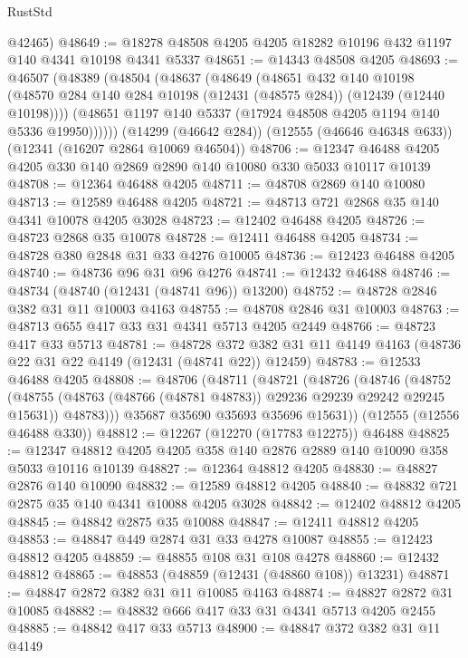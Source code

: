 \begin{lexlean}{RustStd}
\begin{coremodule}
      @42465)
@48649 := @18278 @48508 @4205 @4205 @18282 @10196 @432 @1197 @140 @4341 @10198 @4341 @5337
@48651 := @14343 @48508 @4205
@48693 := @46507
    (@48389
      (@48504
        (@48637
          (@48649
            (@48651
              @432
              @140
              @10198
              (@48570 @284 @140 @284 @10198 (@12431 (@48575 @284)) (@12439 (@12440 @10198))))
            (@48651 @1197 @140 @5337 (@17924 @48508 @4205 @1194 @140 @5336 @19950))))))
    (@14299 (@46642 @284))
    (@12555 (@46646 @46348 @633))
    (@12341 (@16207 @2864 @10069 @46504))
@48706 := @12347 @46488 @4205 @4205 @330 @140 @2869 @2890 @140 @10080 @330 @5033 @10117 @10139
@48708 := @12364 @46488 @4205
@48711 := @48708 @2869 @140 @10080
@48713 := @12589 @46488 @4205
@48721 := @48713 @721 @2868 @35 @140 @4341 @10078 @4205 @3028
@48723 := @12402 @46488 @4205
@48726 := @48723 @2868 @35 @10078
@48728 := @12411 @46488 @4205
@48734 := @48728 @380 @2848 @31 @33 @4276 @10005
@48736 := @12423 @46488 @4205
@48740 := @48736 @96 @31 @96 @4276
@48741 := @12432 @46488
@48746 := @48734 (@48740 (@12431 (@48741 @96)) @13200)
@48752 := @48728 @2846 @382 @31 @11 @10003 @4163
@48755 := @48708 @2846 @31 @10003
@48763 := @48713 @655 @417 @33 @31 @4341 @5713 @4205 @2449
@48766 := @48723 @417 @33 @5713
@48781 := @48728
    @372
    @382
    @31
    @11
    @4149
    @4163
    (@48736 @22 @31 @22 @4149 (@12431 (@48741 @22)) @12459)
@48783 := @12533 @46488 @4205
@48808 := @48706
    (@48711
      (@48721
        (@48726
          (@48746
            (@48752
              (@48755 (@48763 (@48766 (@48781 @48783)) @29236 @29239 @29242 @29245 @15631))
              @48783)))
        @35687
        @35690
        @35693
        @35696
        @15631))
    (@12555 (@12556 @46488 @330))
@48812 := @12267 (@12270 (@17783 @12275)) @46488
@48825 := @12347 @48812 @4205 @4205 @358 @140 @2876 @2889 @140 @10090 @358 @5033 @10116 @10139
@48827 := @12364 @48812 @4205
@48830 := @48827 @2876 @140 @10090
@48832 := @12589 @48812 @4205
@48840 := @48832 @721 @2875 @35 @140 @4341 @10088 @4205 @3028
@48842 := @12402 @48812 @4205
@48845 := @48842 @2875 @35 @10088
@48847 := @12411 @48812 @4205
@48853 := @48847 @449 @2874 @31 @33 @4278 @10087
@48855 := @12423 @48812 @4205
@48859 := @48855 @108 @31 @108 @4278
@48860 := @12432 @48812
@48865 := @48853 (@48859 (@12431 (@48860 @108)) @13231)
@48871 := @48847 @2872 @382 @31 @11 @10085 @4163
@48874 := @48827 @2872 @31 @10085
@48882 := @48832 @666 @417 @33 @31 @4341 @5713 @4205 @2455
@48885 := @48842 @417 @33 @5713
@48900 := @48847
    @372
    @382
    @31
    @11
    @4149

\end{coremodule}
\end{lexlean}

